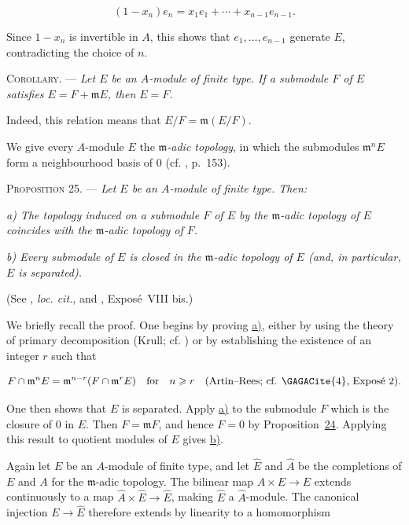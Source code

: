 \begin{equation*}
(1-x_n)e_n=x_1e_1+\cdots+x_{n-1}e_{n-1}.
\end{equation*}

Since $1-x_n$ is invertible in $A$, this shows that
$e_1,\ldots,e_{n-1}$ generate $E$, contradicting the choice of $n$.

\textsc{Corollary}. --- \emph{Let $E$ be an
$A$-module of finite type. If a submodule $F$ of $E$ satisfies
$E=F+\mathfrak{m}E$, then $E=F$.}

Indeed, this relation means that $E/F=\mathfrak{m}(E/F)$.

We give every $A$-module $E$ the \emph{$\mathfrak{m}$-adic topology}, in which
the submodules $\mathfrak{m}^nE$ form a neighbourhood basis of $0$ (cf. ,
p.~153).

\textsc{Proposition 25}. --- \emph{Let $E$ be an
$A$-module of finite type. Then:}

\emph{a) The topology induced on a submodule
$F$ of $E$ by the $\mathfrak{m}$-adic topology of $E$ coincides with the
$\mathfrak{m}$-adic topology of $F$.}

\emph{b) Every submodule of $E$ is closed in
the $\mathfrak{m}$-adic topology of $E$ (and, in particular, $E$ is
separated).}

(See , \emph{loc. cit.}, and , Exposé~VIII bis.)

We briefly recall the proof. One begins by proving
\hyperref[gaga:prop:25:item:a]{a)}, either by using the theory of primary
decomposition (Krull; cf. ) or by establishing the existence of an
integer $r$ such that

\begin{equation*}
F\cap\mathfrak{m}^nE
=\mathfrak{m}^{n-r}(F\cap\mathfrak{m}^rE)
\quad\text{for}\quad n\geqslant r
\quad\text{(Artin--Rees; cf. \GAGACite{4}, Exposé~2).}
\end{equation*}

One then shows that $E$ is separated. Apply
\hyperref[gaga:prop:25:item:a]{a)} to the submodule $F$ which is the closure of
$0$ in $E$. Then $F=\mathfrak{m}F$, and hence $F=0$ by
Proposition~\hyperref[gaga:prop:24]{24}. Applying this result to quotient
modules of $E$ gives \hyperref[gaga:prop:25:item:b]{b)}.

Again let $E$ be an $A$-module of finite type, and let $\widehat{E}$ and
$\widehat{A}$ be the completions of $E$ and $A$ for the $\mathfrak{m}$-adic
topology. The bilinear map $A\times E\to E$ extends continuously to a map
$\widehat{A}\times\widehat{E}\to\widehat{E}$, making $\widehat{E}$ a
$\widehat{A}$-module. The canonical injection $E\to\widehat{E}$ therefore
extends by linearity to a homomorphism

